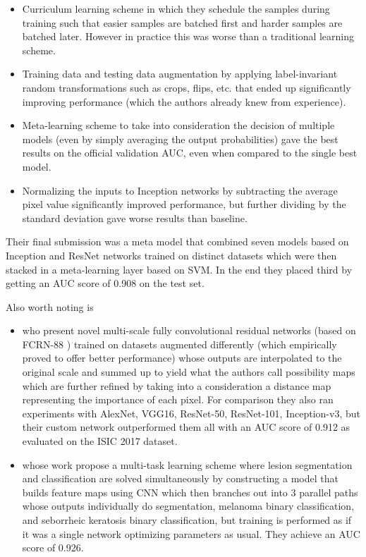 \begin{itemize}
    \item Curriculum learning scheme in which they schedule the samples during training such that easier samples are batched first and harder samples are batched later. However in practice this was worse than a traditional learning scheme.
    \item Training data and testing data augmentation by applying label-invariant random transformations such as crops, flips, etc. that ended up significantly improving performance (which the authors already knew from experience).
    \item Meta-learning scheme to take into consideration the decision of multiple models (even by simply averaging the output probabilities) gave the best results on the official validation AUC, even when compared to the single best model.
    \item Normalizing the inputs to Inception networks by subtracting the average pixel value significantly improved performance, but further dividing by the standard deviation gave worse results than baseline.
\end{itemize}

Their final submission was a meta model that combined seven models based on Inception and ResNet networks trained on distinct datasets which were then stacked in a meta-learning layer based on SVM. In the end they placed third by getting an AUC score of 0.908 on the test set.

Also worth noting is

\begin{itemize}
    \item \citeauthor{isic2017li} \cite{isic2017li} who present novel multi-scale fully convolutional residual networks (based on FCRN-88 \cite{fcrn}) trained on datasets augmented differently (which empirically proved to offer better performance) whose outputs are interpolated to the original scale and summed up to yield what the authors call possibility maps which are further refined by taking into a consideration a distance map representing the importance of each pixel. For comparison they also ran experiments with AlexNet, VGG16, ResNet-50, ResNet-101, Inception-v3, but their custom network outperformed them all with an AUC score of 0.912 as evaluated on the \ac{ISIC} 2017 dataset.
    \item \citeauthor{yang2017} \cite{yang2017} whose work propose a multi-task learning scheme where lesion segmentation and classification are solved simultaneously by constructing a model that builds feature maps using \ac{CNN} which then branches out into 3 parallel paths whose outputs individually do segmentation, melanoma binary classification, and seborrheic keratosis binary classification, but training is performed as if it was a single network optimizing parameters as usual. They achieve an AUC score of 0.926.
\end{itemize}


